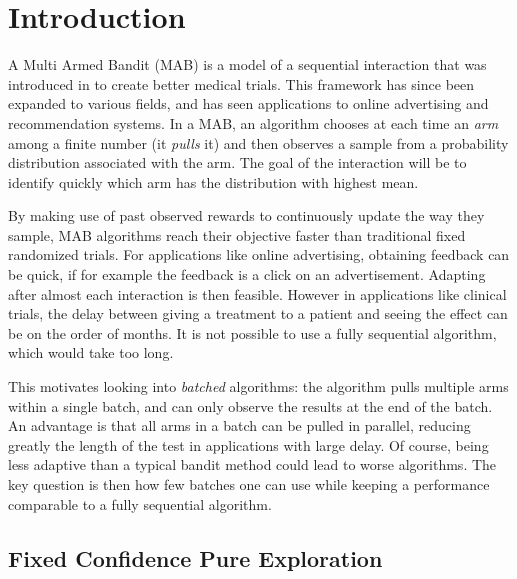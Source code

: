 

\section{Introduction}

A Multi Armed Bandit (MAB) is a model of a sequential interaction that was introduced in \citep{thompsonLikelihoodThatOne1933} to create better medical trials.
This framework has since been expanded to various fields, and has seen applications to online advertising and recommendation systems.
In a MAB, an algorithm chooses at each time an \emph{arm} among a finite number (it \emph{pulls} it) and then observes a sample from a probability distribution associated with the arm.
The goal of the interaction will be to identify quickly which arm has the distribution with highest mean.

By making use of past observed rewards to continuously update the way they sample, MAB algorithms reach their objective faster than traditional fixed randomized trials.
For applications like online advertising, obtaining feedback can be quick, if for example the feedback is a click on an advertisement. Adapting after almost each interaction is then feasible.
However in applications like clinical trials, the delay between giving a treatment to a patient and seeing the effect can be on the order of months.
It is not possible to use a fully sequential algorithm, which would take too long.

This motivates looking into \textit{batched} algorithms: the algorithm pulls multiple arms within a single batch, and can only observe the results at the end of the batch.
An advantage is that all arms in a batch can be pulled in parallel, reducing greatly the length of the test in applications with large delay.
Of course, being less adaptive than a typical bandit method could lead to worse algorithms.
The key question is then how few batches one can use while keeping a performance comparable to a fully sequential algorithm.


\subsection{Fixed Confidence Pure Exploration}


